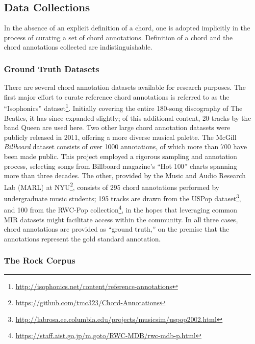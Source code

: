 \documentclass{article}
\begin{document}
\subsection{Data Collections}\label{subsec:data}

In the absence of an explicit definition of a chord, one is adopted implicitly in the process of curating a set of chord annotations.
Definition of a chord and the chord annotations collected are indistinguishable.

\subsubsection{Ground Truth Datasets}

There are several chord annotation datasets available for research purposes.
The first major effort to curate reference chord annotations is referred to as the ``Isophonics'' dataset\footnote{\url{http://isophonics.net/content/reference-annotations}}.
Initially covering the entire 180-song discography of The Beatles, it has since expanded slightly;
of this additional content, 20 tracks by the band Queen are used here.
Two other large chord annotation datasets were publicly released in 2011, offering a more diverse musical palette.
The McGill \emph{Billboard} dataset consists of over 1000 annotations, of which more than 700 have been made public.
This project employed a rigorous sampling and annotation process, selecting songs from Billboard magazine's ``Hot 100'' charts spanning more than three decades.
The other, provided by the Music and Audio Research Lab (MARL) at NYU\footnote{\url{https://github.com/tmc323/Chord-Annotations}}, consists of 295 chord annotations performed by undergraduate music students;
195 tracks are drawn from the USPop dataset\footnote{\url{http://labrosa.ee.columbia.edu/projects/musicsim/uspop2002.html}}, and 100 from the RWC-Pop collection\footnote{\url{https://staff.aist.go.jp/m.goto/RWC-MDB/rwc-mdb-p.html}}, in the hopes that leveraging common MIR datasets might facilitate access within the community.
In all three cases, chord annotations are provided as ``ground truth,'' on the premise that the annotations represent the gold standard annotation.


\subsubsection{The Rock Corpus}
\end{document}
